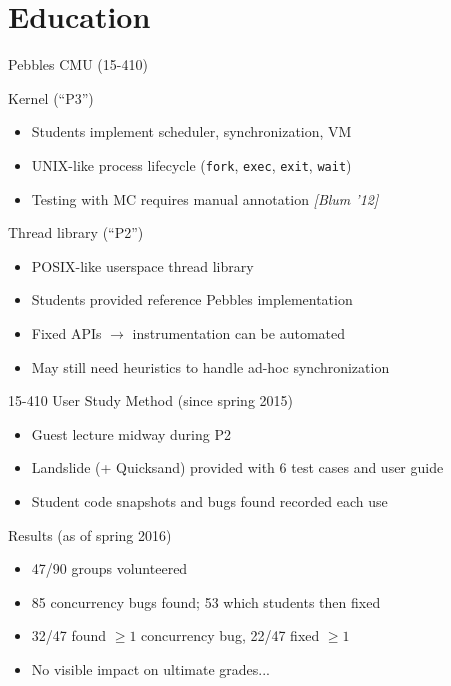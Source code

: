 \documentclass[xcolor=dvipsnames]{beamer}
\begin{document}

\section{Education}


\begin{frame}{Pebbles}
	CMU (15-410)
	\linegap

	Kernel (``P3'')
	\begin{itemize}
		\item Students implement scheduler, synchronization, VM %
		\item UNIX-like process lifecycle ({\tt fork}, {\tt exec}, {\tt exit}, {\tt wait})
		\item Testing with MC requires manual annotation {\em [Blum '12]}
	\end{itemize}
	\pause
	\linegap

	Thread library (``P2'')
	\begin{itemize}
		\item POSIX-like userspace thread library %
		\item Students provided reference Pebbles implementation
		\item Fixed APIs $\rightarrow$ instrumentation can be automated
		\item May still need heuristics to handle ad-hoc synchronization
	\end{itemize}
\end{frame}

\begin{frame}{15-410 User Study}
	Method (since spring 2015)
	\begin{itemize}
		\item Guest lecture midway during P2
		\item Landslide (+ Quicksand) provided with 6 test cases and user guide
		\item Student code snapshots and bugs found recorded each use
	\end{itemize}
	\pause
	\linegap

	Results (as of spring 2016)
	\begin{itemize}
		\item 47/90 groups volunteered
		\item 85 concurrency bugs found; 53 which students then fixed
		\item 32/47 found $\ge 1$ concurrency bug, 22/47 fixed $\ge 1$
		\item No visible impact on ultimate grades...
	\end{itemize}
\end{frame}
\end{document}
